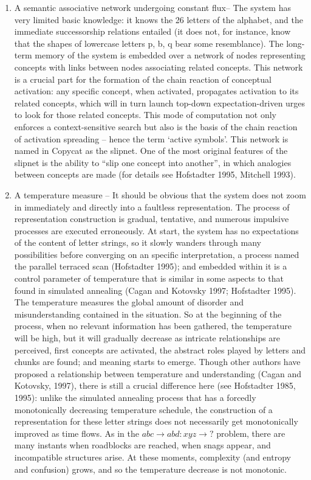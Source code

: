 \begin{enumerate}
\item A semantic associative network undergoing constant flux– The system has very limited basic knowledge: it knows the 26 letters of the alphabet, and the immediate successorship relations entailed (it does not, for instance, know that the shapes of lowercase letters p, b, q bear some resemblance).  The long-term memory of the system is embedded over a network of nodes representing concepts with links between nodes associating related concepts.  This network is a crucial part for the formation of the chain reaction of conceptual activation: any specific concept, when activated, propagates activation to its related concepts, which will in turn launch top-down expectation-driven urges to look for those related concepts. This mode of computation not only enforces a context-sensitive search but also is the basis of the chain reaction of activation spreading – hence the term ‘active symbols’.  This network is named in Copycat as the slipnet.    One of the most original features of the slipnet is the ability to “slip one concept into another”, in which analogies between concepts are made (for details see Hofstadter 1995, Mitchell 1993).  

\item A temperature measure – It should be obvious that the system does not zoom in immediately and directly into a faultless representation.  The process of representation construction is gradual, tentative, and numerous impulsive processes are executed erroneously.  At start, the system has no expectations of the content of letter strings, so it slowly wanders through many possibilities before converging on an specific interpretation, a process named the parallel terraced scan (Hofstadter 1995); and embedded within it is a control parameter of temperature that is similar in some aspects to that found in simulated annealing (Cagan and Kotovsky 1997; Hofstadter 1995).  The temperature measures the global amount of disorder and misunderstanding contained in the situation.  So at the beginning of the process, when no relevant information has been gathered, the temperature will be high, but it will gradually decrease as intricate relationships are perceived, first concepts are activated, the abstract roles played by letters and chunks are found; and meaning starts to emerge.  Though other authors have proposed a relationship between temperature and understanding (Cagan and Kotovsky, 1997), there is still a crucial difference here (see Hofstadter 1985, 1995): unlike the simulated annealing process that has a forcedly monotonically decreasing temperature schedule, the construction of a representation for these letter strings does not necessarily get monotonically improved as time flows.  As in the $abc\to abd : xyz\to ?$ problem, there are many instants when roadblocks are reached, when snags appear, and incompatible structures arise. At these moments, complexity (and entropy and confusion) grows, and so the temperature decrease is not monotonic.


\end{enumerate}
